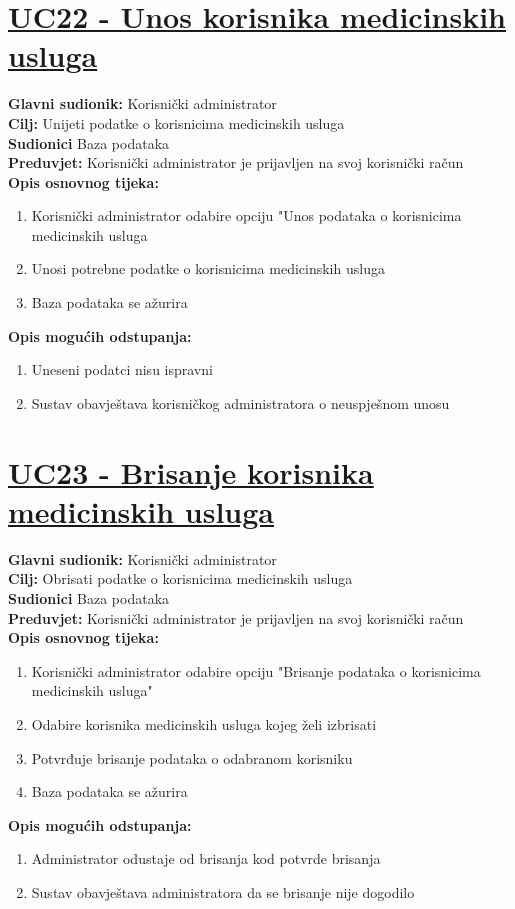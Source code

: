 \documentclass{article}
\begin{document}
	\section* {\underline{UC22 - Unos korisnika medicinskih usluga}}
	\textbf{Glavni sudionik:} Korisnički administrator \\
	\textbf{Cilj:} Unijeti podatke o korisnicima medicinskih usluga\\
	\textbf{Sudionici} Baza podataka \\
	\textbf{Preduvjet:} Korisnički administrator je prijavljen na svoj korisnički račun\\
	\textbf{Opis osnovnog tijeka:}
	\begin{enumerate}
		\item Korisnički administrator odabire opciju "Unos podataka o korisnicima medicinskih usluga
		\item Unosi potrebne podatke o korisnicima medicinskih usluga
		\item Baza podataka se ažurira
	\end{enumerate}
	\textbf{Opis mogućih odstupanja:}
	\begin{enumerate}
		\item Uneseni podatci nisu ispravni
		\item Sustav obavještava korisničkog administratora o neuspješnom unosu
	\end{enumerate}
	
	\section* {\underline{UC23 - Brisanje korisnika medicinskih usluga}}
	\textbf{Glavni sudionik:} Korisnički administrator \\
	\textbf{Cilj:} Obrisati podatke o korisnicima medicinskih usluga\\
	\textbf{Sudionici} Baza podataka \\
	\textbf{Preduvjet:} Korisnički administrator je prijavljen na svoj korisnički račun\\
	\textbf{Opis osnovnog tijeka:}
	\begin{enumerate}
		\item Korisnički administrator odabire opciju "Brisanje podataka o korisnicima medicinskih usluga"
		\item Odabire korisnika medicinskih usluga kojeg želi izbrisati
		\item Potvrđuje brisanje podataka o odabranom korisniku
		\item Baza podataka se ažurira
	\end{enumerate}
	\textbf{Opis mogućih odstupanja:}
	\begin{enumerate}
		\item Administrator odustaje od brisanja kod potvrde brisanja
		\item Sustav obavještava administratora da se brisanje nije dogodilo
	\end{enumerate}
	
\end{document}
